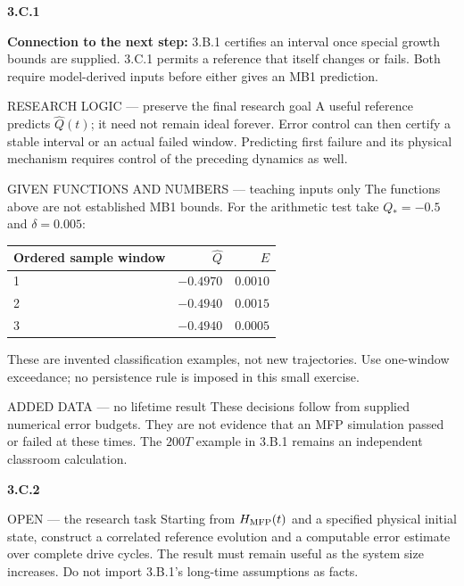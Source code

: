 \documentclass[11pt,a4paper]{article}
\begin{document}
\par\medskip\textbf{3.C.1}\par
{\small\textbf{Connection to the next step:} 3.B.1 certifies an interval once special growth bounds are supplied. 3.C.1 permits a reference that itself changes or fails. Both require model-derived inputs before either gives an MB1 prediction.}\par
\begin{greenbox}{RESEARCH LOGIC --- preserve the final research goal}
A useful reference predicts $\widehat Q(t)$; it need not remain ideal forever. Error control can then certify a stable interval or an actual failed window. Predicting first failure and its physical mechanism requires control of the preceding dynamics as well.
\end{greenbox}
\begin{redbox}{GIVEN FUNCTIONS AND NUMBERS --- teaching inputs only}
The functions above are not established MB1 bounds. For the arithmetic test take $Q_*=-0.5$ and $\delta=0.005$:
\begin{center}\begin{tabular}{@{}lrr@{}}\toprule
Ordered sample window&$\widehat Q$&$E$\\\midrule
1&$-0.4970$&$0.0010$\\
2&$-0.4940$&$0.0015$\\
3&$-0.4940$&$0.0005$\\\bottomrule
\end{tabular}\end{center}
These are invented classification examples, not new trajectories. Use one-window exceedance; no persistence rule is imposed in this small exercise.
\end{redbox}
\begin{redbox}{ADDED DATA --- no lifetime result}
These decisions follow from supplied numerical error budgets. They are not evidence that an MFP simulation passed or failed at these times. The $200T$ example in 3.B.1 remains an independent classroom calculation.
\end{redbox}
\par\medskip\textbf{3.C.2}\par
\begin{redbox}{OPEN --- the research task}
Starting from $H_{\rm MFP}(t)$ and a specified physical initial state, construct a correlated reference evolution and a computable error estimate over complete drive cycles. The result must remain useful as the system size increases. Do not import 3.B.1's long-time assumptions as facts.
\end{redbox}
\end{document}
